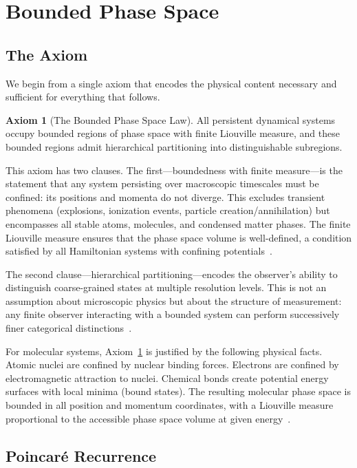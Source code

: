 \documentclass[11pt,twocolumn,a4paper]{article}
\theoremstyle{definition}
\newtheorem{axiom}[theorem]{Axiom}
\theoremstyle{remark}
\begin{document}
\section{Bounded Phase Space}
\label{sec:bpsl}

\subsection{The Axiom}
\label{sec:axiom}

We begin from a single axiom that encodes the physical content necessary and sufficient for everything that follows.

\begin{axiom}[The Bounded Phase Space Law]
\label{ax:bpsl}
All persistent dynamical systems occupy bounded regions of phase space with finite Liouville measure, and these bounded regions admit hierarchical partitioning into distinguishable subregions.
\end{axiom}

This axiom has two clauses. The first---boundedness with finite measure---is the statement that any system persisting over macroscopic timescales must be confined: its positions and momenta do not diverge. This excludes transient phenomena (explosions, ionization events, particle creation/annihilation) but encompasses all stable atoms, molecules, and condensed matter phases. The finite Liouville measure ensures that the phase space volume is well-defined, a condition satisfied by all Hamiltonian systems with confining potentials~\citep{arnold1989}.

The second clause---hierarchical partitioning---encodes the observer's ability to distinguish coarse-grained states at multiple resolution levels. This is not an assumption about microscopic physics but about the structure of measurement: any finite observer interacting with a bounded system can perform successively finer categorical distinctions~\citep{landauer1961}.

For molecular systems, Axiom~\ref{ax:bpsl} is justified by the following physical facts. Atomic nuclei are confined by nuclear binding forces. Electrons are confined by electromagnetic attraction to nuclei. Chemical bonds create potential energy surfaces with local minima (bound states). The resulting molecular phase space is bounded in all position and momentum coordinates, with a Liouville measure proportional to the accessible phase space volume at given energy~\citep{landau1977}.

\subsection{Poincar\'e Recurrence}
\label{sec:poincare}
\end{document}
